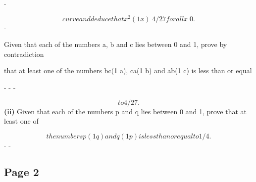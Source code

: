 \documentclass[12pt]{article}
\begin{document}
\begin{flushleft}
-\par
\[curve and deduce that x^2(1 x)  4/27 for all x  0 .\]
-\par
Given that each of the numbers a, b and c lies between 0 and 1, prove by contradiction\par
that at least one of the numbers bc(1 a), ca(1 b) and ab(1 c) is less than or equal\par
- - -\par
\[to 4/27.\]
\textbf{(ii)} Given that each of the numbers p and q lies between 0 and 1, prove that at least one of\par
\[the numbers p(1 q) and q(1 p) is less than or equal to 1/4.\]
- -\par
\end{flushleft}
\subsection*{Page 2}
\end{document}
